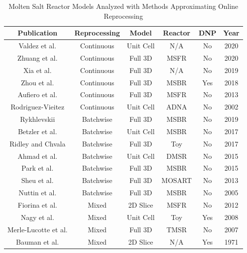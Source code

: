 \begin{table}[H]
\renewcommand{\arraystretch}{1.25}
\caption{Molten Salt Reactor Models Analyzed with Methods Approximating Online Reprocessing}
\label{tab:codes_types}
\begin{center}
\begin{tabular}{  c | c | c | c | c | c}
 \hline
 Publication & Reprocessing & Model & Reactor & DNP & Year\\
 \hline
 \hline
 Valdez et al. \cite{jr_vicente_valdez_modeling_2020} & Continuous & Unit Cell & N/A & No & 2020\\
 Zhuang et al. \cite{zhuang_extended_2020} & Continuous & Full 3D & MSFR & No & 2020\\
 Xia et al. \cite{xia_development_2019} & Continuous & Full 3D & N/A & No & 2019\\
 Zhou et al. \cite{zhou_fuel_2018} & Continuous & Full 3D & MSBR & Yes & 2018\\
 Aufiero et al. \cite{aufiero_extended_2013} & Continuous & Full 3D & MSFR & No & 2013\\
 Rodriguez-Vieitez \cite{rodriguez-vieitez_transmutation_2002} & Continuous & Unit Cell & ADNA & No & 2002\\
 \hline
 
 Rykhlevskii \cite{rykhlevskii_modeling_2019} & Batchwise & Full 3D & MSBR & No & 2019\\
 Betzler et al. \cite{betzler_molten_2017} & Batchwise & Unit Cell & MSBR & No & 2017\\
 Ridley and Chvala \cite{ridley_method_2017} & Batchwise & Full 3D & Toy & No & 2017\\
 Ahmad et al. \cite{ahmad_neutronics_2015} & Batchwise & Unit Cell & DMSR & No & 2015\\
 Park et al. \cite{park_whole_2015} & Batchwise & Full 3D & MSBR & No & 2015\\
 Sheu et al. \cite{sheu_depletion_2013} & Batchwise & Full 3D & MOSART & No & 2013\\
 Nuttin et al. \cite{nuttin_potential_2005} & Batchwise & Full 3D & MSBR & No & 2005\\
 
 \hline
 Fiorina et al. \cite{fiorina_preliminary_2012} & Mixed & 2D Slice & MSFR & No & 2012\\
 Nagy et al. \cite{nagy_parametric_2008} & Mixed & Unit Cell & Toy & Yes & 2008\\
 Merle-Lucotte et al. \cite{merle-lucotte_thorium_2007} & Mixed & Full 3D & TMSR & No & 2007\\
 Bauman et al. \cite{h_f_bauman_rod_1971} & Mixed & 2D Slice & N/A & Yes & 1971\\
 
 \hline
\end{tabular}
\end{center}
\end{table}

